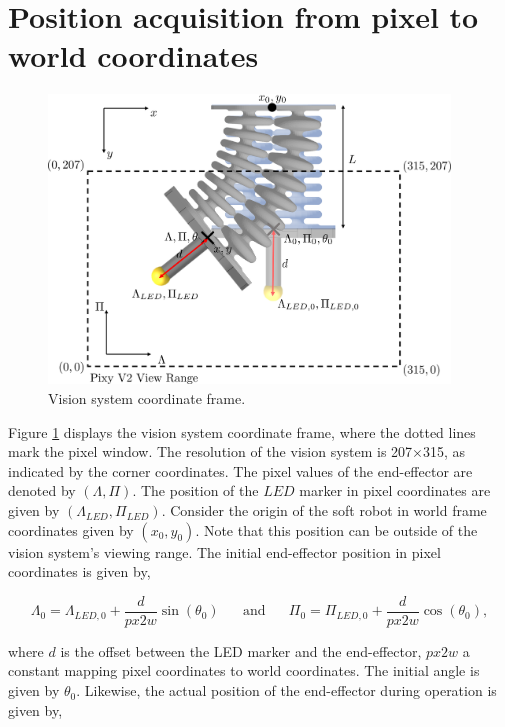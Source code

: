 \label{app:chap5}

\section{Position acquisition from pixel to world coordinates}

\begin{figure}[H]
    \centering
    \includegraphics[width = 0.95\textwidth]{Figures/Appendix5/pix2w.png}
    \caption{Vision system coordinate frame.}
    \label{figapp5:px2w}
\end{figure}


Figure \ref{figapp5:px2w} displays the vision system coordinate frame, where the dotted lines mark the pixel window. The resolution of the vision system is 207$\times$315, as indicated by the corner coordinates. The pixel values of the end-effector are denoted by $(\Lambda,\Pi)$. The position of the $LED$ marker in pixel coordinates are given by $(\Lambda_{LED},\Pi_{LED})$. Consider the origin of the soft robot in world frame coordinates given by $(x_0,y_0)$. Note that this position can be outside of the vision system's viewing range. The initial end-effector position in pixel coordinates is given by,


\begin{equation}
    \Lambda_0 = \Lambda_{LED,0} + \frac{d}{px2w} \sin(\theta_0) \hspace{20pt} \text{and} \hspace{20pt} \Pi_0 = \Pi_{LED,0} + \frac{d}{px2w} \cos(\theta_0),
\end{equation}

where $d$ is the offset between the LED marker and the end-effector, $px2w$ a constant mapping pixel coordinates to world coordinates. The initial angle is given by $\theta_0$. Likewise, the actual position of the end-effector during operation is given by,



